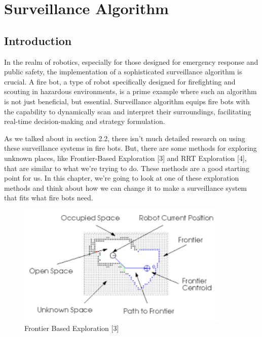 \chapter{Surveillance Algorithm}


\section{Introduction}
\label{sec:Introduction}

In the realm of robotics, especially for those designed for emergency response and public safety, the implementation of a sophisticated surveillance algorithm is crucial. A fire bot, a type of robot specifically designed for firefighting and scouting in hazardous environments, is a prime example where such an algorithm is not just beneficial, but essential. Surveillance algorithm equips fire bots with the capability to dynamically scan and interpret their surroundings, facilitating real-time decision-making and strategy formulation.

As we talked about in section 2.2, there isn't much detailed research on using these surveillance systems in fire bots. But, there are some methods for exploring unknown places, like Frontier-Based Exploration [3] and RRT Exploration [4], that are similar to what we're trying to do. These methods are a good starting point for us. In this chapter, we're going to look at one of these exploration methods and think about how we can change it to make a surveillance system that fits what fire bots need.

\begin{figure}[h]
  \centering
  \includegraphics[width=0.9\textwidth, height=0.5\textheight]{Bilder/FBE1.png}
  \caption{Frontier Based Exploration [3]}
  \label{fig:FBE1}
\end{figure}

